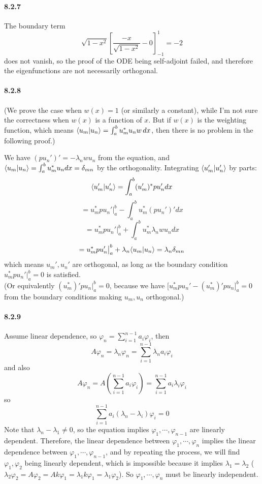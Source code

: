 \documentclass[a4paper]{article}
\begin{document}
\paragraph{8.2.7}
The boundary term 
\[
\sqrt{1-x^2}\left[\frac{-x}{\sqrt{1-x^2}}-0 \right]_{-1}^1=-2
\]
does not vanish, so the proof of the ODE being self-adjoint failed, and therefore the eigenfunctions are not necessarily orthogonal.


\paragraph{8.2.8}
(We prove the case when $w(x)=1$ (or similarly a constant), while I'm not sure the correctness when $w(x)$ is a function of $x$. But if $w(x)$ is the weighting function, which means $\langle u_m|u_n\rangle=\int_a^bu_m^*u_nw\,dx$, then there is no problem in the following proof.)

We have $(pu_n')'=-\lambda_nwu_n$ from the equation, and $\langle u_m|u_n\rangle=\int_a^bu_m^*u_ndx=\delta_{mn}$ by the orthogonality.
Integrating $\langle u_m'|u_n'\rangle$ by parts:
\[
\langle u_m'|u_n'\rangle=\int_a^b(u_m')^*pu_n'dx
\]
\[
=u_m^*pu_n'\big|_a^b-\int_a^bu_m^*(pu_n')'dx
\]
\[
=u_m^*pu_n'\big|_a^b+\int_a^bu_m^*\lambda_nwu_ndx
\]
\[
=u_m^*pu_n'\big|_a^b+\lambda_n\langle u_m|u_n\rangle=\lambda_n\delta_{mn}
\]
which means $u_m',u_n'$ are orthogonal, as long as the boundary condition $u_m^*pu_n'\big|_a^b=0$ is satisfied. \\(Or equivalently $(u_m^*)'pu_n\big|_a^b=0$, because we have $\big[u_m^*pu_n'-(u_m^*)'pu_n \big]_a^b=0$ from the boundary conditions making  $u_m,u_n$ orthogonal.)

\paragraph{8.2.9}
Assume linear dependence, so $\varphi_n=\sum_{i=1}^{n-1}a_i\varphi_i$, then 
\[
A\varphi_n=\lambda_n\varphi_n=\sum_{i=1}^{n-1}\lambda_na_i\varphi_i
\]
and also
\[
A\varphi_n=A(\sum_{i=1}^{n-1}a_i\varphi_i)=\sum_{i=1}^{n-1}a_i\lambda_i\varphi_i
\]
so
\[
\sum_{i=1}^{n-1}a_i(\lambda_n-\lambda_i)\varphi_i=0
\]
Note that $\lambda_n-\lambda_1\neq0$, so the equation implies $\varphi_1,\cdots,\varphi_{n-1}$ are linearly dependent. Therefore, the linear dependence between $\varphi_1,\cdots,\varphi_n$ implies the linear dependence between $\varphi_1,\cdots,\varphi_{n-1}$, and by repeating the process, we will find $\varphi_1,\varphi_2$ being linearly dependent, which is impossible because it implies $\lambda_1=\lambda_2$ ($\lambda_2\varphi_2=A\varphi_2=Ak\varphi_1=\lambda_1k\varphi_1=\lambda_1\varphi_2$). So $\varphi_1,\cdots,\varphi_n$ must be linearly independent.
\end{document}
